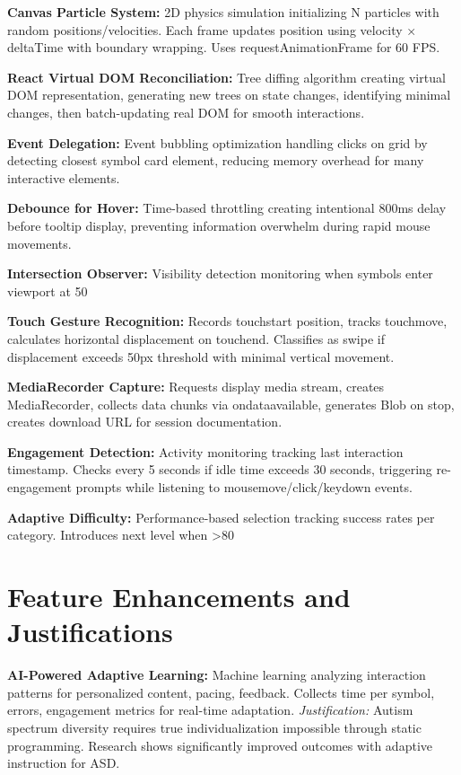 \documentclass[11pt, a4paper]{article}
\begin{document}
\textbf{Canvas Particle System:} 2D physics simulation initializing N particles with random positions/velocities. Each frame updates position using velocity × deltaTime with boundary wrapping. Uses requestAnimationFrame for 60 FPS.

\textbf{React Virtual DOM Reconciliation:} Tree diffing algorithm creating virtual DOM representation, generating new trees on state changes, identifying minimal changes, then batch-updating real DOM for smooth interactions.

\textbf{Event Delegation:} Event bubbling optimization handling clicks on grid by detecting closest symbol card element, reducing memory overhead for many interactive elements.

\textbf{Debounce for Hover:} Time-based throttling creating intentional 800ms delay before tooltip display, preventing information overwhelm during rapid mouse movements.

\textbf{Intersection Observer:} Visibility detection monitoring when symbols enter viewport at 50%

\textbf{Touch Gesture Recognition:} Records touchstart position, tracks touchmove, calculates horizontal displacement on touchend. Classifies as swipe if displacement exceeds 50px threshold with minimal vertical movement.

\textbf{MediaRecorder Capture:} Requests display media stream, creates MediaRecorder, collects data chunks via ondataavailable, generates Blob on stop, creates download URL for session documentation.

\textbf{Engagement Detection:} Activity monitoring tracking last interaction timestamp. Checks every 5 seconds if idle time exceeds 30 seconds, triggering re-engagement prompts while listening to mousemove/click/keydown events.

\textbf{Adaptive Difficulty:} Performance-based selection tracking success rates per category. Introduces next level when >80%

\section{Feature Enhancements and Justifications}

\textbf{AI-Powered Adaptive Learning:} Machine learning analyzing interaction patterns for personalized content, pacing, feedback. Collects time per symbol, errors, engagement metrics for real-time adaptation. \textit{Justification:} Autism spectrum diversity requires true individualization impossible through static programming. Research shows significantly improved outcomes with adaptive instruction for ASD.
\end{document}
